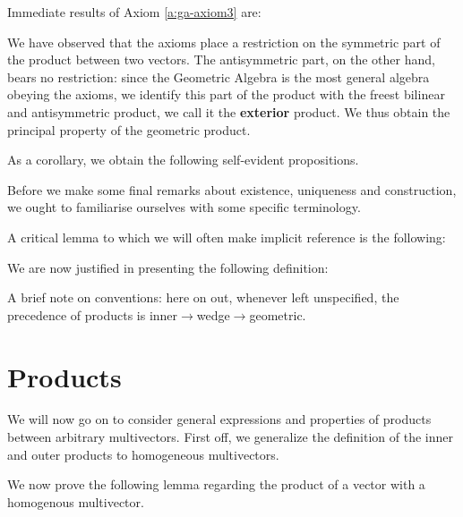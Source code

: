Immediate results of Axiom \ref{a:ga-axiom3} are:





%

We have observed that the axioms place a restriction on the symmetric part of the product between two vectors. The antisymmetric part, on the other hand, bears no restriction: since the Geometric Algebra is the most general algebra obeying the axioms, we identify this part of the product with the freest bilinear and antisymmetric product, we call it the \textbf{exterior} product. We thus obtain the principal property of the geometric product.



As a corollary, we obtain the following self-evident propositions.
%
%



Before we make some final remarks about existence, uniqueness and construction, we ought to familiarise ourselves with some specific terminology.


A critical lemma to which we will often make implicit reference is the following:



We are now justified in presenting the following definition:


A brief note on conventions: here on out, whenever left unspecified, the precedence of products is inner$\to$wedge$\to$geometric.

\newpage

\section{Products}
We will now go on to consider general expressions and properties of products between arbitrary multivectors.
First off, we generalize the definition of the inner and outer products to homogeneous multivectors.



We now prove the following lemma regarding the product of a vector with a homogenous multivector.



